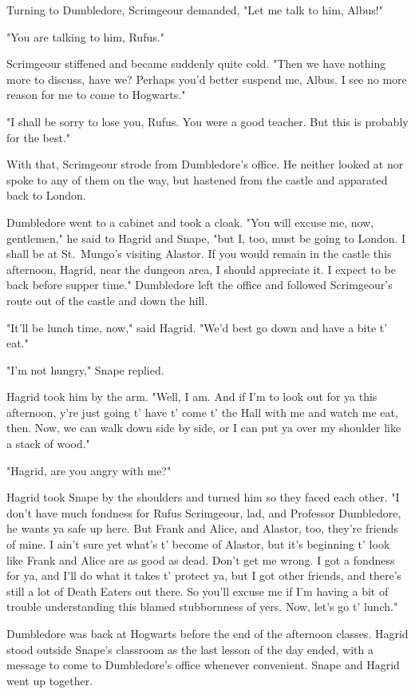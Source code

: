 Turning to Dumbledore, Scrimgeour demanded, "Let me talk to him, Albus!"

"You are talking to him, Rufus."

Scrimgeour stiffened and became suddenly quite cold. "Then we have nothing more to discuss, have we? Perhaps you'd better suspend me, Albus. I see no more reason for me to come to Hogwarts."

"I shall be sorry to lose you, Rufus. You were a good teacher. But this is probably for the best."

With that, Scrimgeour strode from Dumbledore's office. He neither looked at nor spoke to any of them on the way, but hastened from the castle and apparated back to London.

Dumbledore went to a cabinet and took a cloak. "You will excuse me, now, gentlemen," he said to Hagrid and Snape, "but I, too, must be going to London. I shall be at St.~Mungo's visiting Alastor. If you would remain in the castle this afternoon, Hagrid, near the dungeon area, I should appreciate it. I expect to be back before supper time." Dumbledore left the office and followed Scrimgeour's route out of the castle and down the hill.

"It'll be lunch time, now," said Hagrid. "We'd best go down and have a bite t' eat."

"I'm not hungry," Snape replied.

Hagrid took him by the arm. "Well, I am. And if I'm to look out for ya this afternoon, y're just going t' have t' come t' the Hall with me and watch me eat, then. Now, we can walk down side by side, or I can put ya over my shoulder like a stack of wood."

"Hagrid, are you angry with me?"

Hagrid took Snape by the shoulders and turned him so they faced each other. "I don't have much fondness for Rufus Scrimgeour, lad, and Professor Dumbledore, he wants ya safe up here. But Frank and Alice, and Alastor, too, they're friends of mine. I ain't sure yet what's t' become of Alastor, but it's beginning t' look like Frank and Alice are as good as dead. Don't get me wrong. I got a fondness for ya, and I'll do what it takes t' protect ya, but I got other friends, and there's still a lot of Death Eaters out there. So you'll excuse me if I'm having a bit of trouble understanding this blamed stubbornness of yers. Now, let's go t' lunch."

Dumbledore was back at Hogwarts before the end of the afternoon classes. Hagrid stood outside Snape's classroom as the last lesson of the day ended, with a message to come to Dumbledore's office whenever convenient. Snape and Hagrid went up together.

